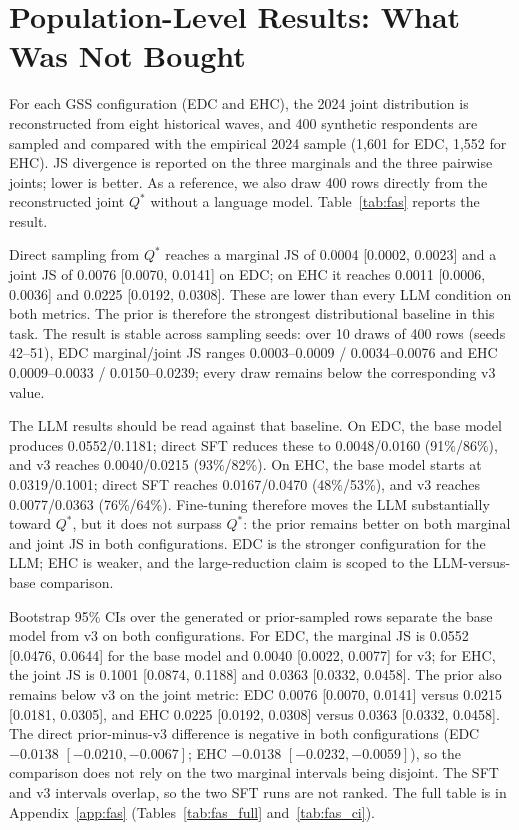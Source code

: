 \section{Population-Level Results: What Was Not Bought}

For each GSS configuration (EDC and EHC), the 2024 joint distribution is
reconstructed from eight historical waves, and 400 synthetic respondents are
sampled and compared with the empirical 2024 sample (1,601 for EDC, 1,552 for
EHC). JS divergence is reported on the three marginals and the three pairwise
joints; lower is better. As a reference, we also draw 400 rows directly from the
reconstructed joint $Q^{\ast}$ without a language model. Table~\ref{tab:fas}
reports the result.



Direct sampling from $Q^{\ast}$ reaches a marginal JS of 0.0004 [0.0002, 0.0023] and
a joint JS of 0.0076 [0.0070, 0.0141] on EDC; on EHC it reaches 0.0011 [0.0006,
0.0036] and 0.0225 [0.0192, 0.0308]. These are lower than every LLM condition on
both metrics. The prior is therefore the strongest distributional baseline in
this task. The result is stable across sampling seeds: over 10 draws of 400
rows (seeds 42--51), EDC marginal/joint JS ranges 0.0003--0.0009 / 0.0034--0.0076
and EHC 0.0009--0.0033 / 0.0150--0.0239; every draw remains below the
corresponding v3 value.

The LLM results should be read against that baseline. On EDC, the base model
produces 0.0552/0.1181; direct SFT reduces these to 0.0048/0.0160 (91\%/86\%), and
v3 reaches 0.0040/0.0215 (93\%/82\%). On EHC, the base model starts at
0.0319/0.1001; direct SFT reaches 0.0167/0.0470 (48\%/53\%), and v3 reaches
0.0077/0.0363 (76\%/64\%). Fine-tuning therefore moves the LLM substantially
toward $Q^{\ast}$, but it does not surpass $Q^{\ast}$: the prior remains better on both
marginal and joint JS in both configurations. EDC is the stronger configuration
for the LLM; EHC is weaker, and the large-reduction claim is scoped to the
LLM-versus-base comparison.

Bootstrap 95\% CIs over the generated or prior-sampled rows separate the base
model from v3 on both configurations. For EDC, the marginal JS is 0.0552
[0.0476, 0.0644] for the base model and 0.0040 [0.0022, 0.0077] for v3; for
EHC, the joint JS is 0.1001 [0.0874, 0.1188] and 0.0363 [0.0332, 0.0458]. The
prior also remains below v3 on the joint metric: EDC 0.0076 [0.0070, 0.0141]
versus 0.0215 [0.0181, 0.0305], and EHC 0.0225 [0.0192, 0.0308] versus 0.0363
[0.0332, 0.0458]. The direct prior-minus-v3 difference is negative in both
configurations (EDC $-0.0138$ $[-0.0210, -0.0067]$; EHC $-0.0138$
$[-0.0232, -0.0059]$), so the comparison does not rely on the two marginal
intervals being disjoint. The SFT and v3 intervals overlap, so the two SFT runs
are not ranked. The full table is in Appendix~\ref{app:fas}
(Tables~\ref{tab:fas_full} and~\ref{tab:fas_ci}).

